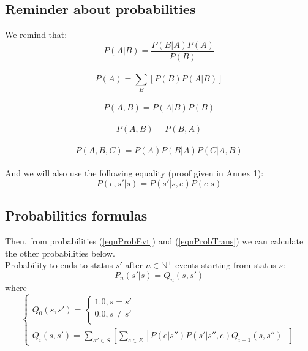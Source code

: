 \documentclass[12pt, a4paper]{article}
\begin{document}
\subsection{Reminder about probabilities}

We remind that:\\
\begin{equation}
P(A|B)=\frac{P(B|A)P(A)}{P(B)}
\end{equation}\\
\begin{equation}
P(A)=\sum_B\left[P(B)P(A|B)\right]
\end{equation}\\
\begin{equation}
P(A,B)=P(A|B)P(B)
\end{equation}\\
\begin{equation}
P(A,B)=P(B,A)
\end{equation}\\
\begin{equation}
P(A,B,C)=P(A)P(B|A)P(C|A,B)
\end{equation}\\

And we will also use the following equality (proof given in Annex 1):\\
\begin{equation}
P(e,s'|s)=P(s'|s,e)P(e|s)
\end{equation}

\subsection{Probabilities formulas}

Then, from probabilities (\ref{eqnProbEvt}) and (\ref{eqnProbTrans}) we can calculate the other probabilities below.\\

Probability to ends to status $s'$ after $n\in\mathbb{N}^+$ events starting from status $s$:\\
\begin{equation}
P_n(s'|s)=Q_n(s,s')
\end{equation}
where
$$
\left\lbrace
\begin{array}{l}
Q_0(s,s')=
\left\lbrace
\begin{array}{l}
1.0,s=s'\\
0.0,s\neq s'\\
\end{array}
\right.\\
Q_i(s,s')=\sum_{s''\in S}\left[\sum_{e\in E}\left[P(e|s'')P(s'|s'',e)Q_{i-1}(s,s'')\right]\right]
\end{array}
\right.
$$\\
\end{document}
